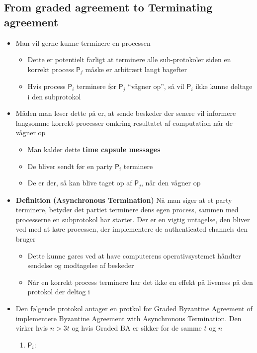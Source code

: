 \documentclass[a4, english]{article}
\begin{document}
\subsection{From graded agreement to Terminating agreement}
\begin{itemize}
	\item Man vil gerne kunne terminere en processen
  \begin{itemize}
  	\item Dette er potentielt farligt at terminere alle sub-protokoler siden en korrekt process $\mathsf P_j$ måske er arbitrært  langt bagefter
    \item Hvis process $\mathsf P_i$ terminere før $\mathsf P_j$ ``vågner op'', så vil $\mathsf P_i$ ikke kunne deltage i den subprotokol 
  \end{itemize}  
  \item Måden man løser dette på er, at sende beskeder der senere vil informere langsomme korrekt processer omkring resultatet af computation når de vågner op     
  \begin{itemize}
  	\item Man kalder dette \textbf{time capsule messages}
    \item De bliver sendt før en party $\mathsf P_i$ terminere
    \item De er der, så kan blive taget op af $\mathsf P_j$, når den vågner op
  \end{itemize}
  \item \textbf{Definition (Asynchronous Termination)} Nå man siger at et party terminere, betyder det partiet terminere dens egen process, sammen med processerne en subprotokol har startet. Der er en vigtig untagelse, den bliver ved med at køre processen, der implementere de authenticated channels den bruger 
  \begin{itemize}
    \item Dette kunne gøres ved at have computerens operativsystemet håndter sendelse og modtagelse af beskeder  
    \item Når en korrekt process terminere har det ikke en effekt på liveness på den protokol der deltog i 
  \end{itemize}
  \item Den følgende protokol antager en protkol for Graded Byzantine Agreement of implementere Byzantine Agreement with Asynchronous Termination. Den virker hvis $n > 3t$ og hvis Graded BA er sikker for de samme $t$ og $n$ 
  \begin{enumerate}
  	\item $\mathsf P_i:$

\end{enumerate}
\end{itemize}
\end{document}
